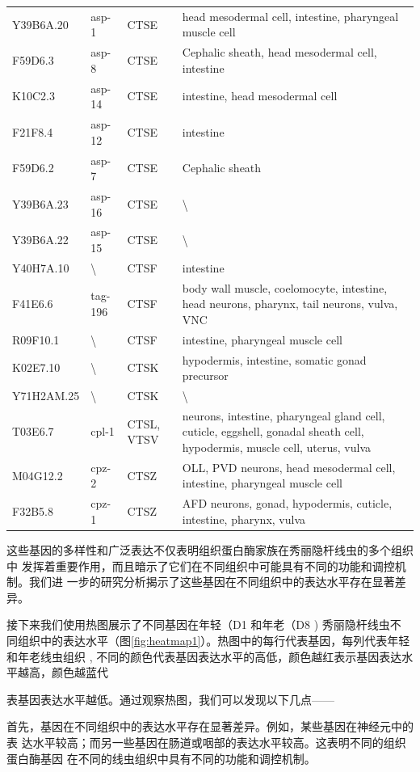 \begin{longtable}{lllp{7cm}}
Y39B6A.20 & asp-1 & CTSE & head mesodermal cell, intestine, pharyngeal muscle cell \\
F59D6.3 & asp-8 & CTSE & Cephalic sheath, head mesodermal cell, intestine \\
K10C2.3 & asp-14 & CTSE & intestine, head mesodermal cell \\
F21F8.4 & asp-12 & CTSE & intestine \\
F59D6.2 & asp-7 & CTSE & Cephalic sheath \\
Y39B6A.23 & asp-16 & CTSE & \textbackslash \\
Y39B6A.22 & asp-15 & CTSE & \textbackslash \\
Y40H7A.10 & \textbackslash & CTSF & intestine \\
F41E6.6 & tag-196 & CTSF & body wall muscle, coelomocyte, intestine, head neurons, pharynx, tail neurons, vulva, VNC \\
R09F10.1 & \textbackslash & CTSF & intestine, pharyngeal muscle cell \\
K02E7.10 & \textbackslash & CTSK & hypodermis, intestine, somatic gonad precursor \\
Y71H2AM.25 & \textbackslash & CTSK & \textbackslash \\
T03E6.7 & cpl-1 & CTSL, VTSV & neurons, intestine, pharyngeal gland cell, cuticle, eggshell, gonadal sheath cell, hypodermis, muscle cell, uterus, vulva \\
M04G12.2 & cpz-2 & CTSZ & OLL, PVD neurons, head mesodermal cell, intestine, pharyngeal muscle cell \\
F32B5.8 & cpz-1 & CTSZ & AFD neurons, gonad, hypodermis, cuticle, intestine, pharynx, vulva \\

\end{longtable}

这些基因的多样性和广泛表达不仅表明组织蛋白酶家族在秀丽隐杆线虫的多个组织中 发挥着重要作用，而且暗示了它们在不同组织中可能具有不同的功能和调控机制。我们进 一步的研究分析揭示了这些基因在不同组织中的表达水平存在显著差异。

接下来我们使用热图展示了不同基因在年轻（D1   和年老（D8  ) 秀丽隐杆线虫不  同组织中的表达水平（图\ref{fig:heatmap1}）。热图中的每行代表基因，每列代表年轻和年老线虫组织 , 不同的颜色代表基因表达水平的高低，颜色越红表示基因表达水平越高，颜色越蓝代

表基因表达水平越低。通过观察热图，我们可以发现以下几点——

首先，基因在不同组织中的表达水平存在显著差异。例如，某些基因在神经元中的表 达水平较高；而另一些基因在肠道或咽部的表达水平较高。这表明不同的组织蛋白酶基因 在不同的线虫组织中具有不同的功能和调控机制。

